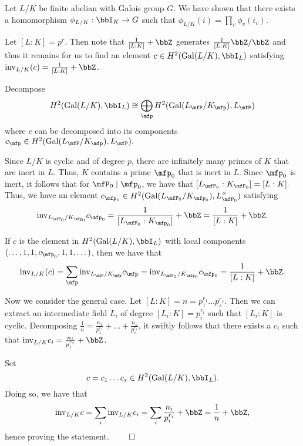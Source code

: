 \documentclass[a4paper, 12pt,oneside,openany]{book}
\begin{document}
Let $L/K$ be finite abelian with Galois group $G$. We have shown that there exists a homomorphism $\phi_{L/K}: \bbI_K \to G$ such that $\phi_{L/K}(i) = \prod\limits_v \phi_v(i_v)$.



 Let $[L:K] = p^r$. Then note that $\frac{1}{[L:K]}+\bbZ$ generates $\frac{1}{[L:K]}\bbZ/\bbZ$ and thus it remains for us to find an element $c \in H^2(\text{Gal}(L/K), \bbI_L)$ satisfying $\text{inv}_{L/K}(c) = \frac{1}{[L:K]}+\bbZ$.

Decompose $$H^2(\text{Gal}(L/K), \bbI_L) \cong \bigoplus\limits_\mfp H^2(\text{Gal}(L_\mfP/K_\mfp), L_\mfP)$$ where $c$ can be decomposed into its components $c_\mfp \in H^2(\text{Gal}(L_\mfP/K_\mfp), L_\mfP).$

Since $L/K$ is cyclic and of degree $p$, there are infinitely many primes of $K$ that are inert in $L$. Thus, $K$ contains a prime $\mfp_0$ that is inert in $L$. Since $\mfp_0$ is inert, it follows that for $\mfP_0 \mid \mfp_0$, we have that $[L_{\mfP_0}: K_{\mfP_0}] = [L:K].$ Thus, we have an element $c_{\mfp_0} \in H^2(\text{Gal}(L_{\mfP_0}/K_{\mfp_0}), L^\times_{\mfP_0})$ satisfying $$\text{inv}_{L_{\mfP_0}/K_{\mfp_0}} c_{\mfp_0} = \frac{1}{[L_{\mfP_0}:K_{\mfp_0}]}+\bbZ = \frac{1}{[L:K]}+\bbZ.$$

If $c$ is the element in $H^2(\text{Gal}(L/K), \bbI_L)$ with local components $(\dots, 1, 1, c_{\mfp_0}, 1, 1, \dots)$, then we have that $$\text{inv}_{L/K}(c) = \sum\limits_{\mfp} \text{inv}_{L_\mfP/K_\mfp} c_\mfp = \text{inv}_{L_{\mfP_0}/K_{\mfp_0}} c_{\mfp_0} = \frac{1}{[L:K]}+\bbZ.$$

Now we consider the general case. Let $[L:K]=n=p_1^{r_1}\dots p_s^{r_s}$. Then we can extract an intermediate field $L_i$ of degree $[L_i:K]=p_i^{r_i}$ such that $[L_i:K]$ is cyclic. Decomposing $\frac{1}{n}=\frac{n_1}{p_1^{r_1}}+\dots+\frac{n_s}{p_s^{r_s}}$, it swiftly follows that there exists a $c_i$ such that $\text{inv}_{L/K} c_i = \frac{n_i}{p_i^{r_i}}+\bbZ$.

Set $$c = c_1 \dots c_s \in H^2(\text{Gal}(L/K), \bbI_L).$$ Doing so, we have that $$\text{inv}_{L/K}c=\sum\limits_{i} \text{inv}_{L/K} c_i = \sum\limits_i \frac{n_i}{p_i^{r_i}}+\bbZ = \frac{1}{n}+\bbZ,$$ hence proving the statement. $\qed$
\end{document}
